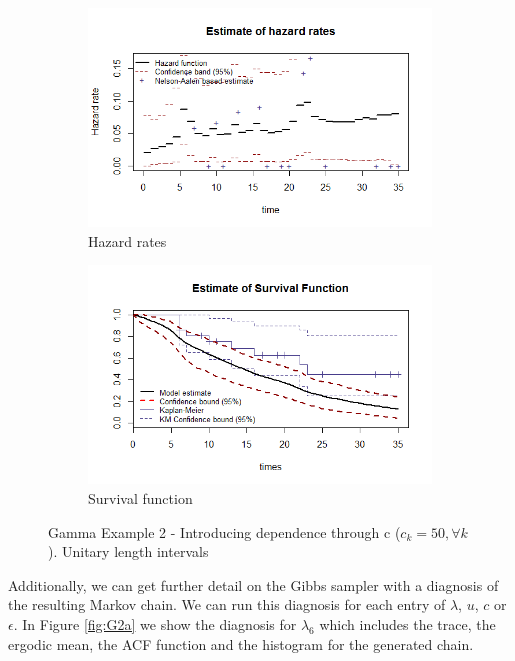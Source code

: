 \documentclass[letterpaper]{article}\usepackage[]{graphicx}\usepackage[]{xcolor}
\begin{document}
\begin{figure}
  \centering
  \begin{subfigure}[a]{\textwidth}\centering
    \includegraphics[width=\textwidth]{G21.png}
    \caption{Hazard rates}
  \end{subfigure}
  \begin{subfigure}[b]{\textwidth}\centering
    \includegraphics[width=\textwidth]{G22.png}
    \caption{Survival function}
  \end{subfigure}
  \caption{Gamma Example 2 - Introducing dependence through c ($c_k=50, \forall k$). Unitary length intervals}
  \label{fig:G2}
\end{figure}

Additionally, we can get further detail on the Gibbs sampler with a diagnosis of the resulting Markov chain. We can run this diagnosis for each entry of $\lambda$, $u$, $c$ or $\epsilon$. In Figure \ref{fig:G2a} we show the diagnosis for $\lambda_6$ which includes the trace, the ergodic mean, the ACF function and the histogram for the generated chain.
\end{document}
